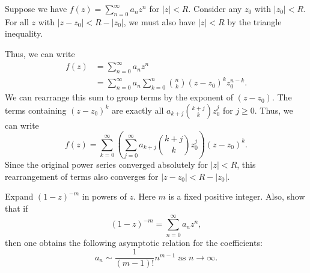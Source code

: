 \documentclass[12 pt, letterpaper]{hmcpset}
\begin{document}
\begin{solution}
	 Suppose we have $f(z) = \sum_{n = 0}^{\infty} a_{n} z^{n}$ for $\lvert z \rvert < R$. Consider any $z_{0}$ with $\lvert z_{0} \rvert < R$. For all $z$ with $\lvert z - z_{0} \rvert < R - \lvert z_{0} \rvert$, we must also have $\lvert z \rvert < R$ by the triangle inequality.

	 Thus, we can write
	 \[
	 	\begin{split}
			f(z) & = \sum_{n = 0}^{\infty} a_{n} z^{n} \\
			     & = \sum_{n = 0}^{\infty} a_{n} \sum_{k = 0}^{n} \binom{n}{k} (z - z_{0})^{k} z_{0}^{n - k}.
	 	\end{split}
	 \]
	 We can rearrange this sum to group terms by the exponent of $(z - z_{0})$. The terms containing $(z - z_{0})^{k}$ are exactly all $a_{k + j} \binom{k + j}{k} z_{0}^{j}$ for $j \ge 0$. Thus, we can write
	 \[
		 f(z) = \sum_{k = 0}^{\infty} \left ( \sum_{j = 0}^{\infty} a_{k + j} \binom{k + j}{k} z_{0}^{j} \right ) (z - z_{0})^{k}.
	 \]
	 Since the original power series converged absolutely for $\lvert z \rvert < R$, this rearrangement of terms also converges for $\lvert z - z_{0} \rvert < R - \lvert z_{0} \rvert$.
\end{solution}

\pagebreak

\begin{problem}[20.]
	Expand $(1 - z)^{-m}$ in powers of $z$. Here $m$ is a fixed positive integer. Also, show that if
	\[
		(1 - z)^{-m} = \sum_{n = 0}^{\infty} a_{n} z^{n},
	\]
	then one obtains the following asymptotic relation for the coefficients:
	\[
		a_{n} \sim \frac{1}{(m - 1)!} n^{m - 1} \text{ as } n \to \infty.
	\]
\end{problem}
\end{document}
